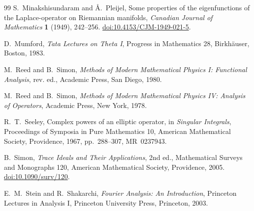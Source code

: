 \documentclass[11pt,a4paper]{article}
\theoremstyle{definition}
\theoremstyle{remark}
\begin{document}
\begin{thebibliography}{99}
S.~Minakshisundaram and {\AA}.~Pleijel,
Some properties of the eigenfunctions of the Laplace-operator on Riemannian
manifolds,
\emph{Canadian Journal of Mathematics} \textbf{1} (1949), 242--256.
\href{https://doi.org/10.4153/CJM-1949-021-5}{doi:10.4153/CJM-1949-021-5}.

D.~Mumford,
\emph{Tata Lectures on Theta I},
Progress in Mathematics 28, Birkh\"auser, Boston, 1983.

M.~Reed and B.~Simon,
\emph{Methods of Modern Mathematical Physics I: Functional Analysis},
rev. ed., Academic Press, San Diego, 1980.

M.~Reed and B.~Simon,
\emph{Methods of Modern Mathematical Physics IV: Analysis of Operators},
Academic Press, New York, 1978.

R.~T.~Seeley,
Complex powers of an elliptic operator,
in \emph{Singular Integrals}, Proceedings of Symposia in Pure Mathematics 10,
American Mathematical Society, Providence, 1967, pp.~288--307,
MR~0237943.

B.~Simon,
\emph{Trace Ideals and Their Applications},
2nd ed., Mathematical Surveys and Monographs 120,
American Mathematical Society, Providence, 2005.
\href{https://doi.org/10.1090/surv/120}{doi:10.1090/surv/120}.

E.~M.~Stein and R.~Shakarchi,
\emph{Fourier Analysis: An Introduction},
Princeton Lectures in Analysis I,
Princeton University Press, Princeton, 2003.

\end{thebibliography}
\end{document}

